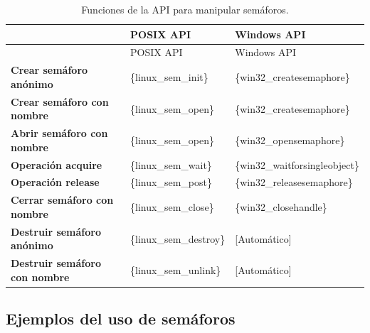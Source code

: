 \begin{longtable}[]{@{}
  >{\raggedright\arraybackslash}p{}
  >{\raggedright\arraybackslash}p{}
  >{\raggedright\arraybackslash}p{}@{}}
\caption{Funciones de la API para manipular semáforos.}\tabularnewline
\toprule\noalign{}
\begin{minipage}[b]{\linewidth}\raggedright
\end{minipage} & \begin{minipage}[b]{\linewidth}\raggedright
POSIX API
\end{minipage} & \begin{minipage}[b]{\linewidth}\raggedright
Windows API
\end{minipage} \\
\midrule\noalign{}
\endfirsthead
\toprule\noalign{}
\begin{minipage}[b]{\linewidth}\raggedright
\end{minipage} & \begin{minipage}[b]{\linewidth}\raggedright
POSIX API
\end{minipage} & \begin{minipage}[b]{\linewidth}\raggedright
Windows API
\end{minipage} \\
\midrule\noalign{}
\endhead
\bottomrule\noalign{}
\endlastfoot
\textbf{Crear semáforo anónimo} & \{linux\_sem\_init\} &
\{win32\_createsemaphore\} \\
\textbf{Crear semáforo con nombre} & \{linux\_sem\_open\} &
\{win32\_createsemaphore\} \\
\textbf{Abrir semáforo con nombre} & \{linux\_sem\_open\} &
\{win32\_opensemaphore\} \\
\textbf{Operación acquire} & \{linux\_sem\_wait\} &
\{win32\_waitforsingleobject\} \\
\textbf{Operación release} & \{linux\_sem\_post\} &
\{win32\_releasesemaphore\} \\
\textbf{Cerrar semáforo con nombre} & \{linux\_sem\_close\} &
\{win32\_closehandle\} \\
\textbf{Destruir semáforo anónimo} & \{linux\_sem\_destroy\} &
{{[}Automático{]}} \\
\textbf{Destruir semáforo con nombre} & \{linux\_sem\_unlink\} &
{{[}Automático{]}} \\
\end{longtable}

\subsection{Ejemplos del uso de
semáforos}\label{_ejemplos_del_uso_de_semuxe1foros}

